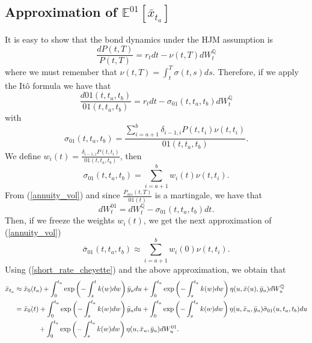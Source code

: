 \documentclass[a4paper,10pt]{article}
\newcommand{\1}{\mathbf{1}}
\begin{document}
\subsection{Approximation of $\mathbb{E}^{01}\left[\bar{x}_{t_a}\right]$}
It is easy to show that the bond dynamics under the HJM assumption is
\begin{equation}
\frac{dP(t,T)}{P(t,T)} = r_t dt - \nu(t,T)dW^{\mathbb{Q}}_t  
\end{equation}
where we must remember that  $\nu(t,T)=\int_{t}^{T}\sigma(t,s) ds$. Therefore, if we apply the Itô formula we have that 
\begin{equation}\label{annuity_spot_dynamic}
\frac{d01(t,t_a,t_b)}{01(t,t_a,t_b)} = r_t dt - \sigma_{01}(t,t_a,t_b)dW^{\mathbb{Q}}_t
\end{equation}
with 
\begin{equation} \label{annuity_vol}
\sigma_{01}(t,t_a,t_b) = \frac{\sum_{i=a+1}^{b} \delta_{i-1,i} P(t,t_i) \nu(t,t_i)}{01(t,t_a,t_b)}.
\end{equation}
We define $w_i(t)=\frac{\delta_{i-1,i} P(t,t_i)}{01(t,t_a,t_b)}$, then
\begin{equation*}
\sigma_{01}(t,t_a,t_b) = \sum_{i=a+1}^{b}  w_i(t) \nu(t,t_i).
\end{equation*}
From (\ref{annuity_vol}) and since $\frac{P_{ois}(t,T)}{01(t)}$ is a martingale, we have that
\begin{equation*}
dW^{01}_t = dW^{\mathbb{Q}}_t - \sigma_{01}(t,t_a,t_b)dt. 
\end{equation*}
Then, if we freeze the weights $w_i(t)$, we get the next approximation of (\ref{annuity_vol})
\begin{equation*} \label{approximation_o1_vol}
\bar{\sigma}_{01}(t,t_a,t_b) \approx \sum_{i=a+1}^{b} w_i(0) \nu(t,t_i).
\end{equation*}
Using (\ref{short_rate_cheyette}) and the above approximation, we obtain that
\begin{align}
\bar{x}_{t_a} &\approx \bar{x}_0(t_a)  + \int_{0}^{t_a} \exp\left(-\int_{s}^{t}k(w) dw\right) \bar{y}_u du + \int_{0}^{t_a}  \exp\left(-\int_{s}^{t_a}k(w) dw\right) \eta(u,\bar{x}(u),\bar{y}_u) dW_u^{\mathbb{Q}} \nonumber \\
&=  \bar{x}_0(t)  + \int_{0}^{t_a} \exp\left(-\int_{s}^{t_a}k(w) dw\right) \bar{y}_u du + \int_{0}^{t_a} \exp\left(-\int_{s}^{t_a}k(w) dw \right) \eta(u,\bar{x}_u,\bar{y}_u) \bar{\sigma}_{01}(u, t_a, t_b) du  \nonumber \\ 
&\hspace{1.2cm} + \int_{0}^{t_a} \exp\left(-\int_{s}^{t_a}k(w) dw \right) \eta(u,\bar{x}_u,\bar{y}_u) dW_u^{01}.
\end{align}
\end{document}
